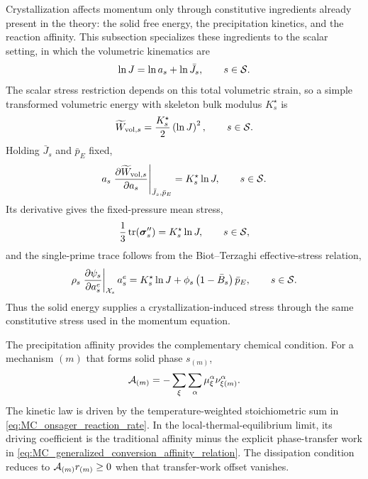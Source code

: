 Crystallization affects momentum only through constitutive ingredients already
present in the theory: the solid free energy, the precipitation kinetics, and
the reaction affinity.  This subsection specializes these ingredients to the
scalar setting, in which the volumetric kinematics are
%
\begin{equation}
	\ln J=\ln a_s+\ln\bar J_s,
	\qquad
	s\in\mathcal{S} .
	\label{eq:MC_crystallization_volumetric_split}
\end{equation}
%
The scalar stress restriction depends on this total volumetric strain, so a
simple transformed volumetric energy with skeleton bulk modulus
\(K_s^\star\) is
%
\begin{equation}
	\widetilde W_{{\rm vol},s}
	=
	\frac{K_s^\star}{2}
	\left(\ln J\right)^2,
	\qquad
	s\in\mathcal{S} .
	\label{eq:MC_component_transformed_volumetric_energy}
\end{equation}
%
Holding \(\bar J_s\) and \(\bar p_E\) fixed,
%
\begin{equation}
	a_s
	\left.
	\frac{\partial \widetilde W_{{\rm vol},s}}{\partial a_s}
	\right\vert_{\bar J_s,\bar p_E}
	=
	K_s^\star\ln J,
	\qquad
	s\in\mathcal{S} .
	\label{eq:MC_component_transformed_volumetric_trace}
\end{equation}
%
Its derivative gives the fixed-pressure mean stress,
%
\begin{equation}
	\frac{1}{3}\operatorname{tr}(\boldsymbol{\sigma}_s^{\prime\prime})
	=
	K_s^\star\ln J,
	\qquad
	s\in\mathcal{S} ,
	\label{eq:MC_component_double_prime_trace_from_energy}
\end{equation}
%
and the single-prime trace follows from the Biot--Terzaghi effective-stress
relation,
%
\begin{equation}
	\rho_s
	\left.
	\frac{\partial \psi_s}{\partial a_s^e}
	\right\vert_{\mathcal{X}_s}
	a_s^e
	=
	K_s^\star\ln J
	+\phi_s\left(1-\bar B_s\right)\bar p_E,
	\qquad
	s\in\mathcal{S} .
	\label{eq:MC_component_cn_trace_satisfied}
\end{equation}
%
Thus the solid energy supplies a crystallization-induced stress through the
same constitutive stress used in the momentum equation.

The precipitation affinity provides the complementary chemical condition.  For
a mechanism \((m)\) that forms solid phase \(s_{(m)}\),
%
\begin{equation}
	\mathcal{A}_{(m)}
	=
	-
	\sum_\xi\sum_\alpha
	\mu_\xi^\alpha
	\nu_{\xi (m)}^\alpha .
	\label{eq:MC_crystallization_affinity_kinetics}
\end{equation}
%
The kinetic law is driven by the temperature-weighted stoichiometric sum in
\eqref{eq:MC_onsager_reaction_rate}.  In the local-thermal-equilibrium limit,
its driving coefficient is the traditional affinity minus the explicit
phase-transfer work in
\eqref{eq:MC_generalized_conversion_affinity_relation}.  The dissipation
condition reduces to \(\mathcal{A}_{(m)}r_{(m)}\ge0\) when that transfer-work
offset vanishes.

